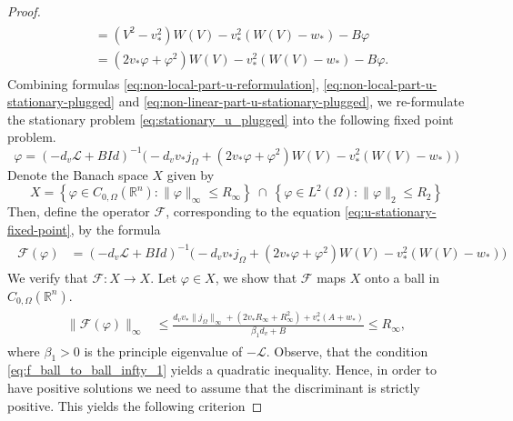 \documentclass[11pt, a4paper]{article}
\theoremstyle{break}
\theoremstyle{break}
\theoremstyle{break}
\theoremstyle{break}
\theoremstyle{break}
\theoremstyle{break}
\theoremstyle{break}
\begin{document}
\begin{proof}
\begin{align}
\begin{split}
            &= (V^2 - v_*^2)W(V) - v_*^2(W(V) - w_*) - B \varphi \\
            &= (2 v_* \varphi + \varphi^2) W(V) - v_*^2(W(V) - w_*) - B \varphi.
        \end{split}
    \end{align}
    Combining formulas \eqref{eq:non-local-part-u-reformulation}, \eqref{eq:non-local-part-u-stationary-plugged} and \eqref{eq:non-linear-part-u-stationary-plugged}, we re-formulate the stationary problem \eqref{eq:stationary_u_plugged} into the following fixed point problem.
    \begin{equation}
        \label{eq:u-stationary-fixed-point}
        \varphi = (-d_v \mathcal{L} + BId)^{-1}\Big(- d_v v_* j_\Omega + (2 v_* \varphi + \varphi^2) W(V) - v_*^2(W(V) - w_*)\Big)
    \end{equation}
    Denote the Banach space $X$ given by
    \begin{equation}
        X = \left\{ \varphi \in C_{0,\Omega}(\mathbb{R}^n): \|\varphi\|_\infty \leq R_\infty \right\} \:\cap\: \left\{ \varphi \in L^2(\Omega): \|\varphi\|_2 \leq R_2 \right\}
    \end{equation}
    Then, define the operator $\mathcal{F}$, corresponding to the equation \eqref{eq:u-stationary-fixed-point}, by the formula
    \begin{align}
        \label{eq:operator-f-def}
        \begin{split}
            \mathcal{F}(\varphi) 
            &= 
            (-d_v \mathcal{L} + BId)^{-1}\Big(- d_v v_* j_\Omega + (2 v_* \varphi + \varphi^2) W(V) - v_*^2(W(V) - w_*)\Big)        
        \end{split}
    \end{align}
    We verify that $\mathcal{F}: X \rightarrow X$. Let $\varphi \in X$, we show that $\mathcal{F}$ maps $X$ onto a ball in $C_{0, \Omega}(\mathbb{R}^n)$.
    \begin{align}
        \label{eq:f_ball_to_ball_infty_1}
        \begin{split}
            \|\mathcal{F}(\varphi)\|_{\infty}
            &\leq
            \frac{d_v v_* \|j_\Omega\|_\infty 
            +
            \left( 2 v_* R_\infty + R^2_\infty \right) 
            +
            v_*^2 (A + w_*)}{\beta_1 d_v + B}
            \leq R_\infty,
        \end{split}
    \end{align}
    where $\beta_1 > 0$ is the principle eigenvalue of $-\mathcal{L}$. Observe, that the condition \eqref{eq:f_ball_to_ball_infty_1} yields a quadratic inequality. Hence, in order to have positive solutions we need to assume that the discriminant is strictly positive. This yields the following criterion

\end{proof}
\end{document}
